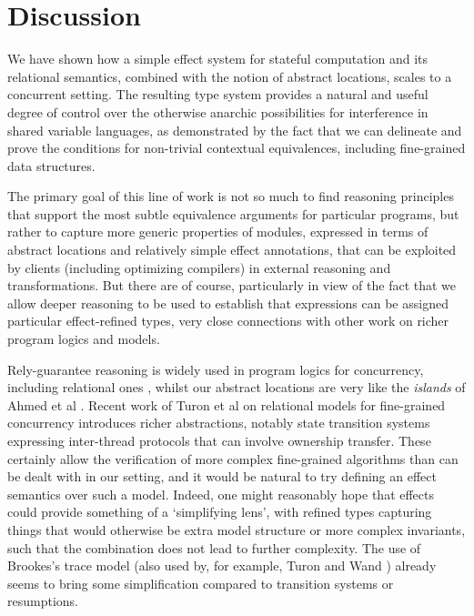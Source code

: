 \documentclass[nocopyrightspace,preprint]{sigplanconf}
\begin{document}
\section{Discussion}
We have shown how a simple effect system for stateful computation and
its relational semantics, combined with the notion of abstract
locations, scales to a concurrent setting. The resulting type system
provides a natural and useful degree of control over the otherwise
anarchic possibilities for interference in shared variable languages,
as demonstrated by the fact that we can delineate and prove the
conditions for non-trivial contextual equivalences, including
fine-grained data structures.

The primary goal of this line of work is not so much to find reasoning
principles that support the most subtle equivalence arguments for
particular programs, but rather to capture more generic properties of
modules, expressed in terms of abstract locations and relatively
simple effect annotations, that can be exploited by clients (including
optimizing compilers) in external reasoning and transformations. But
there are of course, particularly in view of the fact that we allow
deeper reasoning to be used to establish that expressions can be
assigned particular effect-refined types, very close connections with
other work on richer program logics and models. 

Rely-guarantee reasoning is widely used in program logics for concurrency, including
relational ones \cite{liangfengpopl12}, whilst our abstract locations
are very like the \emph{islands} of Ahmed et al
\cite{DBLP:conf/popl/AhmedDR09}. Recent work of Turon et al
\cite{dreyer} on relational models for fine-grained concurrency
introduces richer abstractions, notably state transition systems
expressing inter-thread protocols that can involve ownership
transfer. These certainly allow the verification of more complex
fine-grained algorithms than can be dealt with in our setting, and it
would be natural to try defining an effect semantics over such a
model. Indeed, one might reasonably hope that effects could provide
something of a `simplifying lens', with refined types capturing things
that would otherwise be extra model structure or more complex
invariants, such that the combination does not lead to further
complexity. The use of Brookes's trace model (also used
by, for example, Turon and Wand \cite{DBLP:conf/popl/TuronW11}) already seems to
bring some simplification compared to transition systems or
resumptions. 
\end{document}
